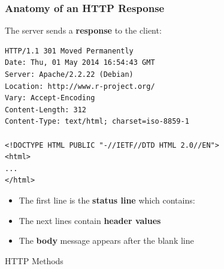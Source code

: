 \documentclass{beamer}\usepackage[]{graphicx}\usepackage[]{color}
\begin{document}
\begin{frame}[fragile]
\frametitle{Anatomy of an HTTP Response}

The server sends a \textbf{response} to the client:

{\tiny
\begin{verbatim}
HTTP/1.1 301 Moved Permanently
Date: Thu, 01 May 2014 16:54:43 GMT
Server: Apache/2.2.22 (Debian)
Location: http://www.r-project.org/
Vary: Accept-Encoding
Content-Length: 312
Content-Type: text/html; charset=iso-8859-1
 
<!DOCTYPE HTML PUBLIC "-//IETF//DTD HTML 2.0//EN">
<html>
...
</html>
\end{verbatim}
}

\begin{itemize}
 \item The first line is the \textbf{status line} which contains: \\
 {\footnotesize {}}
 \item The next lines contain \textbf{header values}
 \item The \textbf{body} message appears after the blank line \\
\end{itemize}

\end{frame}


\begin{frame}
 \begin{center}
  \Huge{\textcolor{mandarina}{HTTP Methods}}
 \end{center}
\end{frame}

\end{document}
